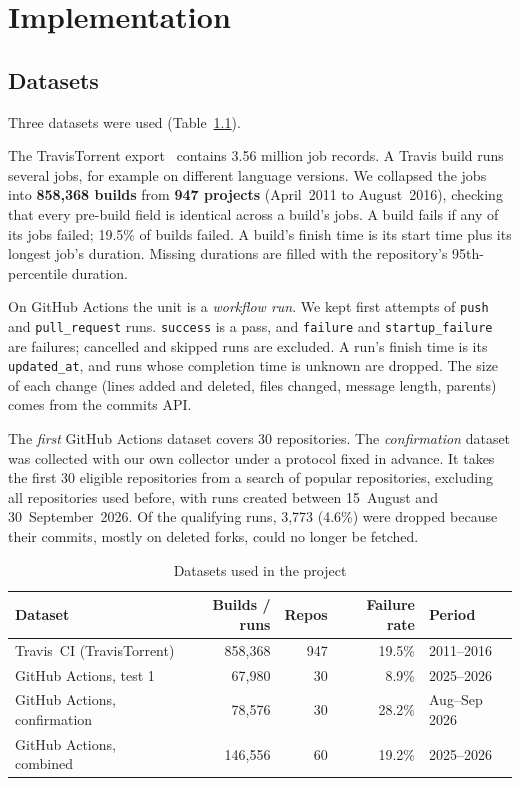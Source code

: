 \chapter{Implementation}
\label{ch:impl}

\section{Datasets}
\label{sec:datasets}
Three datasets were used (Table~\ref{tab:data}).

The TravisTorrent export~\cite{beller2017travistorrent} contains 3.56 million job records. A Travis build runs several jobs, for example on different language versions. We collapsed the jobs into \textbf{858,368 builds} from \textbf{947 projects} (April~2011 to August~2016), checking that every pre-build field is identical across a build's jobs. A build fails if any of its jobs failed; 19.5\% of builds failed. A build's finish time is its start time plus its longest job's duration. Missing durations are filled with the repository's 95th-percentile duration.

On GitHub Actions the unit is a \emph{workflow run}. We kept first attempts of \texttt{push} and \texttt{pull\_request} runs. \texttt{success} is a pass, and \texttt{failure} and \texttt{startup\_failure} are failures; cancelled and skipped runs are excluded. A run's finish time is its \texttt{updated\_at}, and runs whose completion time is unknown are dropped. The size of each change (lines added and deleted, files changed, message length, parents) comes from the commits API.

The \emph{first} GitHub Actions dataset covers 30 repositories. The \emph{confirmation} dataset was collected with our own collector under a protocol fixed in advance. It takes the first 30 eligible repositories from a search of popular repositories, excluding all repositories used before, with runs created between 15~August and 30~September~2026. Of the qualifying runs, 3,773 (4.6\%) were dropped because their commits, mostly on deleted forks, could no longer be fetched.

\begin{table}[H]
\centering
\caption{Datasets used in the project}
\label{tab:data}
\begin{tabular}{|l|r|r|r|l|}
\hline
\textbf{Dataset} & \textbf{Builds / runs} & \textbf{Repos} & \textbf{Failure rate} & \textbf{Period}\\ \hline
Travis~CI (TravisTorrent) & 858,368 & 947 & 19.5\% & 2011--2016\\ \hline
GitHub Actions, test 1 & 67,980 & 30 & 8.9\% & 2025--2026\\ \hline
GitHub Actions, confirmation & 78,576 & 30 & 28.2\% & Aug--Sep 2026\\ \hline
GitHub Actions, combined & 146,556 & 60 & 19.2\% & 2025--2026\\ \hline
\end{tabular}
\end{table}

